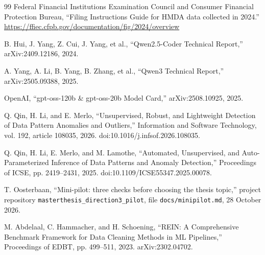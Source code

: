 \documentclass[11pt,a4paper]{article}
\begin{document}
\begin{thebibliography}{99}
 Federal Financial Institutions Examination Council and Consumer Financial Protection Bureau, ``Filing Instructions Guide for HMDA data collected in 2024.'' \url{https://ffiec.cfpb.gov/documentation/fig/2024/overview}

 B. Hui, J. Yang, Z. Cui, J. Yang, et al., ``Qwen2.5-Coder Technical Report,'' arXiv:2409.12186, 2024.

 A. Yang, A. Li, B. Yang, B. Zhang, et al., ``Qwen3 Technical Report,'' arXiv:2505.09388, 2025.

 OpenAI, ``gpt-oss-120b \& gpt-oss-20b Model Card,'' arXiv:2508.10925, 2025.

 Q. Qin, H. Li, and E. Merlo, ``Unsupervised, Robust, and Lightweight Detection of Data Pattern Anomalies and Outliers,'' Information and Software Technology, vol. 192, article 108035, 2026. doi:10.1016/j.infsof.2026.108035.

 Q. Qin, H. Li, E. Merlo, and M. Lamothe, ``Automated, Unsupervised, and Auto-Parameterized Inference of Data Patterns and Anomaly Detection,'' Proceedings of ICSE, pp. 2419--2431, 2025. doi:10.1109/ICSE55347.2025.00078.

 T. Oosterbaan, ``Mini-pilot: three checks before choosing the thesis topic,'' project repository \texttt{masterthesis\_direction3\_pilot}, file \texttt{docs/minipilot.md}, 28 October 2026.

 M. Abdelaal, C. Hammacher, and H. Schoening, ``REIN: A Comprehensive Benchmark Framework for Data Cleaning Methods in ML Pipelines,'' Proceedings of EDBT, pp. 499--511, 2023. arXiv:2302.04702.

\end{thebibliography}
\end{document}
